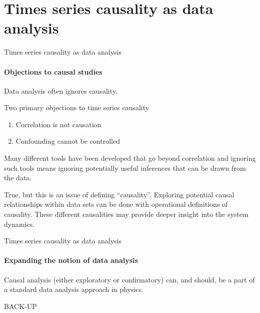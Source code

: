 \documentclass{beamer}
\begin{document}
\section{Times series causality as data analysis}
\begin{frame}{Times series causality as data analysis}
\framesubtitle{Objections to causal studies}
Data analysis often ignores causality.
\vspace{0.2in}
\pause

Two primary objections to time series causality
\begin{enumerate}
\item \alert<3>{Correlation is not causation}
\item \alert<4>{Confounding cannot be controlled}
\end{enumerate}
\vspace{0.2in}
\pause
\alert<3>{Many different tools have been developed that go beyond correlation} and ignoring such tools means ignoring potentially useful inferences that can be drawn from the data.
\vspace{0.15in}

\pause
True, but this is an issue of defining ``causality''.  \alert<4>{Exploring} potential causal relationships within data sets can be done with \alert<4>{operational} definitions of causality.  These different causalities may provide deeper insight into the system dynamics.
\end{frame}

\begin{frame}{Times series causality as data analysis}
\framesubtitle{Expanding the notion of data analysis}
Causal analysis (either exploratory or confirmatory) can, and should, be a part of a standard data analysis approach in physics.
\end{frame}

\begin{frame}{}
\end{frame}

\begin{frame}{}
\begin{center}
BACK-UP
\end{center}
\end{frame}
\end{document}
